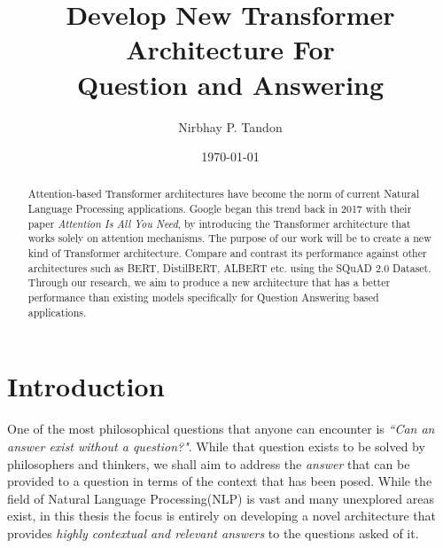 \documentclass[12pt]{report}
\begin{document}
    \title{Develop New Transformer Architecture For \\ Question and Answering}

    \author{Nirbhay P. Tandon}

    \date{\vfill \monthyeardate\today}
    \maketitle


    \newpage
    \newpage
    \tableofcontents
    \newpage
    \listoffigures
    \listoftables
    
    \printnomenclature[1in]
	\begin{abstract}
		Attention-based Transformer architectures have become the norm of current Natural Language Processing applications. Google began this trend back in 2017 with their paper \textit{Attention Is All You Need}, by introducing the Transformer architecture that works solely on attention mechanisms. The purpose of our work will be to create a new kind of Transformer architecture. Compare and contrast its performance against other architectures such as BERT, DistilBERT, ALBERT etc. using the SQuAD 2.0 Dataset. Through our research, we aim to produce a new architecture that has a better performance than existing models specifically for Question Answering based applications.
	\end{abstract}

    \chapter{\centering Introduction}\label{c1introduction}

    One of the most philosophical questions that anyone can encounter is \textit{``Can an answer exist without a question?"}. While that question exists to be solved by philosophers and thinkers, we shall aim to address the \textit{answer} that can be provided to a question in terms of the context that has been posed. While the field of Natural Language Processing(NLP) is vast and many unexplored areas exist, in this thesis the focus is entirely on developing a novel architecture that provides \textit{highly contextual and relevant answers} to the questions asked of it.
\end{document}
